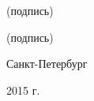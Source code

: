 \begin{titlepage}
\vspace{0.2cm}

\begin{center}
    \small (подпись)
\end{center}

\vspace{0.2cm}

\begin{center}
    \small (подпись)
\end{center}

\vspace{1cm}

\begin{center}
    Санкт-Петербург

    2015 г.
\end{center}

\normalsize
\end{titlepage}
